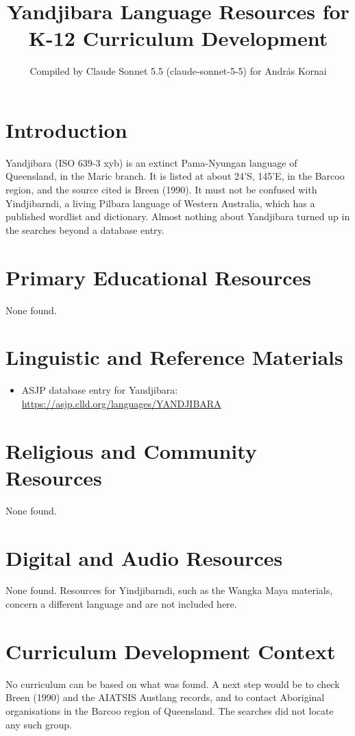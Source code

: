 \documentclass[12pt]{article}
\title{Yandjibara Language Resources for K-12 Curriculum Development}
\author{Compiled by Claude Sonnet 5.5 (claude-sonnet-5-5) for Andr\'as Kornai}
\date{}
\begin{document}
\maketitle

\section{Introduction}
Yandjibara (ISO 639-3 xyb) is an extinct Pama-Nyungan language of Queensland, in the Maric branch. It is listed at about 24'S, 145'E, in the Barcoo region, and the source cited is Breen (1990). It must not be confused with Yindjibarndi, a living Pilbara language of Western Australia, which has a published wordlist and dictionary. Almost nothing about Yandjibara turned up in the searches beyond a database entry.

\section{Primary Educational Resources}
None found.

\section{Linguistic and Reference Materials}
\begin{itemize}
\item ASJP database entry for Yandjibara: \url{https://asjp.clld.org/languages/YANDJIBARA}
\end{itemize}

\section{Religious and Community Resources}
None found.

\section{Digital and Audio Resources}
None found. Resources for Yindjibarndi, such as the Wangka Maya materials, concern a different language and are not included here.

\section{Curriculum Development Context}
No curriculum can be based on what was found. A next step would be to check Breen (1990) and the AIATSIS Austlang records, and to contact Aboriginal organisations in the Barcoo region of Queensland. The searches did not locate any such group.
\end{document}
